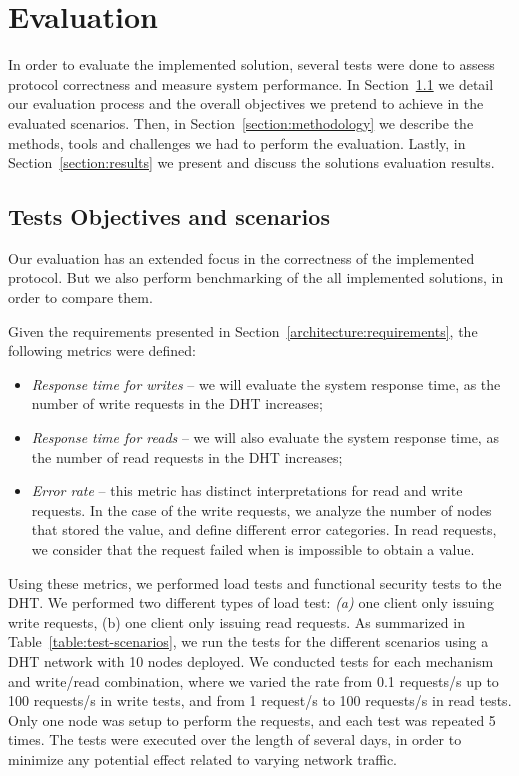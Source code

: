 \chapter{Evaluation}
\label{chapter:evaluation}

In order to evaluate the implemented solution, several tests were done to assess protocol correctness and measure system performance.
In Section~\ref{section:scenarios} we detail our evaluation process and the overall objectives we pretend to achieve in the evaluated scenarios.
Then, in Section~\ref{section:methodology} we describe the methods, tools and challenges we had to perform the evaluation.
Lastly, in Section~\ref{section:results} we present and discuss the solutions evaluation results.

\section{Tests Objectives and scenarios}
\label{section:scenarios}

Our evaluation has an extended focus in the correctness of the implemented protocol.
But we also perform benchmarking of the all implemented solutions, in order to compare them.

Given the requirements presented in Section~\ref{architecture:requirements}, the following metrics were defined:

\begin{itemize}
  \item \textit{Response time for writes} – we will evaluate the system response time, as the number of write requests in the DHT increases;
  \item \textit{Response time for reads} – we will also evaluate the system response time, as the number of read requests in the DHT increases;
  \item \textit{Error rate} – this metric has distinct interpretations for read and write requests. In the case of the write requests, we analyze the number of nodes that stored the value, and define different error categories. In read requests, we consider that the request failed when is impossible to obtain a value.
\end{itemize}

Using these metrics, we performed load tests and functional security tests to the \ac{DHT}.
We performed two different types of load test: \textit{(a)} one client only issuing write requests, (b) one client only issuing read requests.
As summarized in Table~\ref{table:test-scenarios}, we run the tests for the different scenarios using a DHT network with 10 nodes deployed.
We conducted tests for each mechanism and write/read combination, where we varied the rate from 0.1 requests/s up to 100 requests/s in write tests, and from 1 request/s to 100 requests/s in read tests.
Only one node was setup to perform the requests, and each test was repeated 5 times.
The tests were executed over the length of several days, in order to minimize any potential effect related to varying network traffic.

